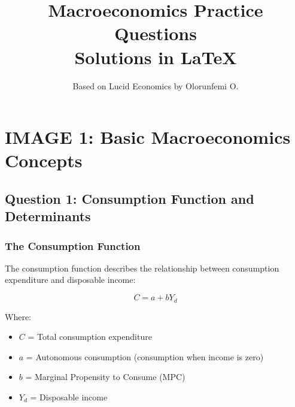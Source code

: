 \documentclass[12pt,a4paper]{article}
\title{\textbf{Macroeconomics Practice Questions}\\\Large Solutions in LaTeX}
\author{Based on Lucid Economics by Olorunfemi O.}
\date{}
\begin{document}
\maketitle
\tableofcontents
\newpage

\section{IMAGE 1: Basic Macroeconomics Concepts}

\subsection{Question 1: Consumption Function and Determinants}

\subsubsection*{The Consumption Function}
The consumption function describes the relationship between consumption expenditure and disposable income:

\begin{equation}
C = a + bY_d
\end{equation}

Where:
\begin{itemize}
    \item $C$ = Total consumption expenditure
    \item $a$ = Autonomous consumption (consumption when income is zero)
    \item $b$ = Marginal Propensity to Consume (MPC)
    \item $Y_d$ = Disposable income
\end{itemize}
\end{document}
